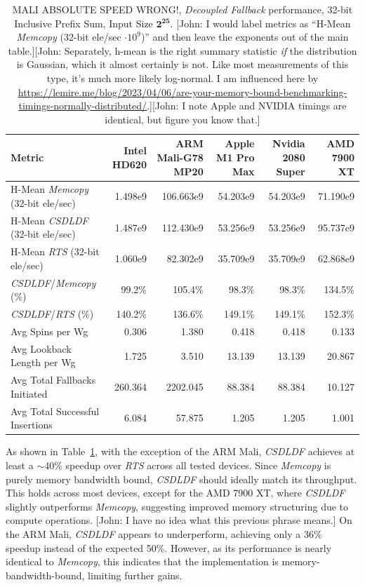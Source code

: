 \documentclass[sigconf]{acmart}
\newcommand{\john}[1]{{\footnotesize\color{cyan}[John: #1]}}
\begin{document}
\begin{table}
  \centering
  \begin{tabular*}{\textwidth}{@{\extracolsep{\fill}} l r r r r r}
    \toprule
    Metric & Intel HD620 & ARM Mali-G78 MP20 & Apple M1 Pro Max & Nvidia 2080 Super & AMD 7900 XT \\
    \midrule
    H-Mean \emph{Memcopy} (32-bit ele/sec)  & 1.498e9   & 106.663e9 & 54.203e9  & 54.203e9  & 71.190e9  \\
    H-Mean \emph{CSDLDF} (32-bit ele/sec)   & 1.487e9   & 112.430e9 & 53.256e9  & 53.256e9  & 95.737e9  \\
    H-Mean \emph{RTS} (32-bit ele/sec)      & 1.060e9   & 82.302e9  & 35.709e9  & 35.709e9  & 62.868e9  \\
    \emph{CSDLDF}/\emph{Memcopy} (\%)       & 99.2\%    & 105.4\%   & 98.3\%    & 98.3\%    & 134.5\%   \\
    \emph{CSDLDF}/\emph{RTS} (\%)          & 140.2\%   & 136.6\%   & 149.1\%   & 149.1\%   & 152.3\%   \\
    Avg Spins per Wg    & 0.306    & 1.380    & 0.418    & 0.418    & 0.133    \\
    Avg Lookback Length per Wg  & 1.725    & 3.510    & 13.139   & 13.139   & 20.867   \\
    Avg Total Fallbacks Initiated      & 260.364   & 2202.045  & 88.384   & 88.384   & 10.127   \\
    Avg Total Successful Insertions    & 6.084     & 57.875    & 1.205    & 1.205    & 1.001    \\
    \bottomrule
  \end{tabular*}
  \caption{MALI ABSOLUTE SPEED WRONG!, \emph{Decoupled Fallback} performance, 32-bit Inclusive Prefix Sum, Input Size $\mathbf{2^{25}}$. \john{I would label metrics as ``H-Mean \emph{Memcopy} (32-bit ele/sec $\cdot 10^9$)'' and then leave the exponents out of the main table.}\john{Separately, h-mean is the right summary statistic \emph{if} the distribution is Gaussian, which it almost certainly is not. Like most measurements of this type, it's much more likely log-normal. I am influenced here by \url{https://lemire.me/blog/2023/04/06/are-your-memory-bound-benchmarking-timings-normally-distributed/}.}\john{I note Apple and NVIDIA timings are identical, but figure you know that.}}
  \label{tab:results}
\end{table}

As shown in Table~\ref{tab:results}, with the exception of the ARM Mali, \emph{CSDLDF} achieves at least a $\sim$40\% speedup over \emph{RTS} across all tested devices. Since \emph{Memcopy} is purely memory bandwidth bound, \emph{CSDLDF} should ideally match its throughput. This holds across most devices, except for the AMD 7900 XT, where \emph{CSDLDF} slightly outperforms \emph{Memcopy}, suggesting improved memory structuring due to compute operations. \john{I have no idea what this previous phrase means.} On the ARM Mali, \emph{CSDLDF} appears to underperform, achieving only a 36\% speedup instead of the expected 50\%. However, as its performance is nearly identical to \emph{Memcopy}, this indicates that the implementation is memory-bandwidth-bound, limiting further gains.
\end{document}
